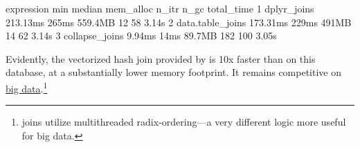 \documentclass[article]{jss} %
\begin{document}
%
\begin{Schunk}
\begin{Soutput}
        expression      min median mem_alloc n_itr n_gc total_time
1      dplyr_joins 213.13ms  265ms   559.4MB    12   58      3.14s
2 data.table_joins 173.31ms  229ms     491MB    14   62      3.14s
3   collapse_joins   9.94ms   14ms    89.7MB   182  100      3.05s
\end{Soutput}
\end{Schunk}
%
Evidently, the vectorized hash join provided by  is 10x faster than  on this database, at a substantially lower memory footprint. It remains competitive on \href{https://duckdblabs.github.io/db-benchmark/}{big data}.\footnote{ joins utilize multithreaded radix-ordering---a very different logic more useful for big data.\vspace{-5mm}} \newline
\end{document}

